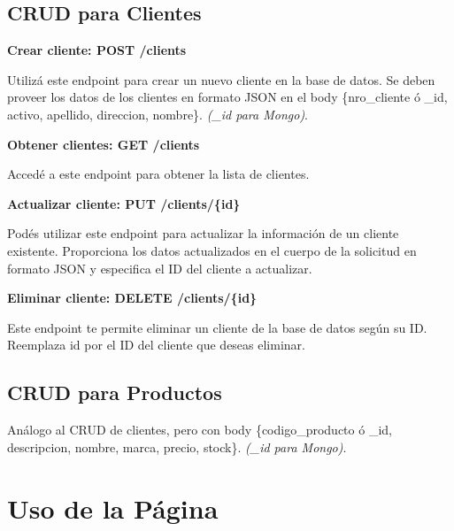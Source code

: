 \documentclass[a4paper,12pt]{article}
\begin{document}
	
	\subsection{CRUD para Clientes}
	
	\textbf{Crear cliente: POST /clients}
	
	\bigskip
	
	Utilizá este endpoint para crear un nuevo cliente en la base de datos. Se deben proveer los datos de los clientes en formato JSON en el body \{nro\_cliente ó \_id, activo, apellido, direccion, nombre\}.
	\textit{(\_id para Mongo)}.
	
	\bigskip
	
	\textbf{Obtener clientes: GET /clients}
	
	\bigskip
	
	Accedé a este endpoint para obtener la lista de clientes.
	
	\bigskip
	\bigskip
	
	\textbf{Actualizar cliente: PUT /clients/\{id\}}
	
	\bigskip
	
	Podés utilizar este endpoint para actualizar la información de un cliente existente. Proporciona los datos actualizados en el cuerpo de la solicitud en formato JSON y especifica el ID del cliente a actualizar.
	
	\bigskip
	
	\textbf{Eliminar cliente: DELETE /clients/\{id\}}
	
	\bigskip
	
	Este endpoint te permite eliminar un cliente de la base de datos según su ID. Reemplaza {id} por el ID del cliente que deseas eliminar.
	
	
	\subsection{CRUD para Productos}
	
	Análogo al CRUD de clientes, pero con body \{codigo\_producto ó \_id, descripcion, nombre, marca, precio, stock\}.
	\textit{(\_id para Mongo)}.
	
	
	
	
	
	
	
	
	\newpage
	
	\section{Uso de la Página}
	
\end{document}
